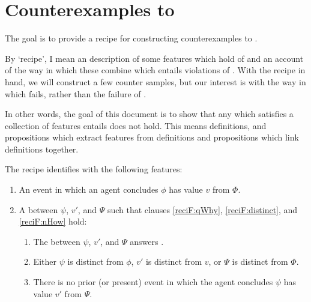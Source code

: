 \section*{Counterexamples to \issueInclusion{}}


\begin{note}
  The goal is to provide a recipe for constructing counterexamples to \issueInclusion{}.

  By `recipe', I mean an description of some features which hold of  and an account of the way in which these combine which entails violations of \issueInclusion{}.
  With the recipe in hand, we will construct a few counter samples, but our interest is with the way in which \issueInclusion{} fails, rather than the failure of \issueInclusion{}.

  In other words, the goal of this document is to show that any  which satisfies a collection of features entails \issueInclusion{} does not hold.
  This means definitions, and propositions which extract features from definitions and propositions which link definitions together.%

  The recipe identifies  with the following features:
  \begin{enumerate}
  \item
    An event in which an agent concludes \(\phi\) has value \(v\) from \(\Phi\).
  \item
    A \ros{} between \(\psi\), \(v'\), and \(\Psi\) such that clauses \ref{reciF:qWhy}, \ref{reciF:distinct}, and \ref{reciF:nHow} hold:
    \begin{enumerate}[label=\Alph*., ref=\Alph*]
    \item
      \label{reciF:qWhy}
      The \ros{} between \(\psi\), \(v'\), and \(\Psi\) answers \qWhy{}.
    \item
      \label{reciF:distinct}
      Either \(\psi\) is distinct from \(\phi\), \(v'\) is distinct from \(v\), or \(\Psi\) is distinct from \(\Phi\).
    \item
      \label{reciF:nHow}
      There is no prior (or present) event in which the agent concludes \(\psi\) has value \(v'\) from \(\Psi\).
    \end{enumerate}
  \end{enumerate}
\end{note}


